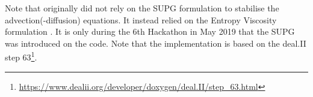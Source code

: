 \begin{remark}
Note that \aspect{} originally did not rely on the SUPG formulation to stabilise the 
advection(-diffusion) equations\cite{krhb12}. It instead relied on the Entropy Viscosity
formulation \cite{gupp10,gupp11}.
It is only during the 6th Hackathon in May 2019 that the SUPG was introduced on the code.
Note that the \aspect{} implementation is based on the deal.II step 
63\footnote{\url{https://www.dealii.org/developer/doxygen/deal.II/step_63.html}}.
\end{remark}





